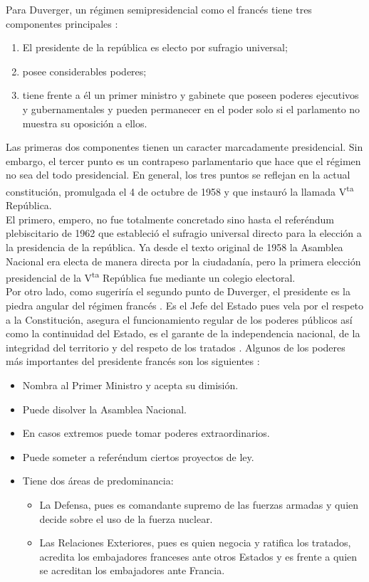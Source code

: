 Para Duverger, un régimen semipresidencial como el francés tiene tres componentes principales \parencite{Veser99}:

\begin{enumerate}
\item El presidente de la república es electo por sufragio universal;
\item posee considerables poderes;
\item tiene frente a él un primer ministro y gabinete que poseen poderes ejecutivos y gubernamentales y pueden permanecer en el poder solo si el parlamento no muestra su oposición a ellos.
\end{enumerate}

Las primeras dos componentes tienen un caracter marcadamente presidencial. Sin embargo, el tercer punto es un contrapeso parlamentario que hace que el régimen no sea del todo presidencial. En general, los tres puntos se reflejan en la actual constitución, promulgada el 4 de octubre de 1958 y que instauró la llamada V\textsuperscript{ta} República.\\ 

El primero, empero, no fue totalmente concretado sino hasta el referéndum plebiscitario de 1962 que estableció el sufragio universal directo para la elección a la presidencia de la república. Ya desde el texto original de 1958 la Asamblea Nacional era electa de manera directa por la ciudadanía, pero la primera elección presidencial de la V\textsuperscript{ta} República fue mediante un colegio electoral.\\ 

Por otro lado, como sugeriría el segundo punto de Duverger, el presidente es la piedra angular del régimen francés \parencite{AN17a}. Es el Jefe del Estado pues vela por el respeto a la Constitución, asegura el funcionamiento regular de los poderes públicos así como la continuidad del Estado, es el garante de la independencia nacional, de la integridad del territorio y del respeto de los tratados \parencite{ConstFr}. Algunos de los poderes más importantes del presidente francés son los siguientes \parencites{AN17a}{ViePublique}: 

\begin{itemize}
\item Nombra al Primer Ministro y acepta su dimisión. 
\item Puede disolver la Asamblea Nacional. 
\item En casos extremos puede tomar poderes extraordinarios. 
\item Puede someter a referéndum ciertos proyectos de ley. 
\item Tiene dos áreas de predominancia: 
		\begin{itemize}
		\item La Defensa, pues es comandante supremo de las fuerzas armadas y quien decide sobre el uso de la fuerza nuclear. 
		\item Las Relaciones Exteriores, pues es quien negocia y ratifica los tratados, acredita los embajadores franceses ante otros Estados y es frente a quien se acreditan los embajadores ante Francia.
		\end{itemize}
\end{itemize}

